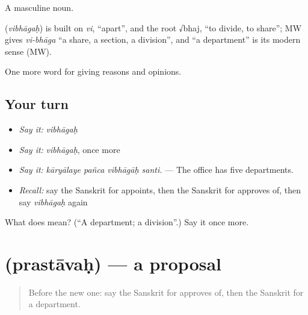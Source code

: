 A masculine noun.

\begin{cousinweb}
\textbf{} (\emph{vibhāgaḥ}) is built on \emph{vi}, \textquotedblleft{}apart\textquotedblright{}, and the root √bhaj, \textquotedblleft{}to divide, to share\textquotedblright{}; MW gives \emph{vi-bhāga} \textquotedblleft{}a share, a section, a division\textquotedblright{}, and \textquotedblleft{}a department\textquotedblright{} is its modern sense (MW).
\end{cousinweb}

\begin{grammarlens}[title={What you've built}]
One more word for giving reasons and opinions.
\end{grammarlens}

\subsection*{Your turn}
\begin{itemize}
\raggedright
  \item \emph{Say it:} \emph{vibhāgaḥ}
  \item \emph{Say it:} \emph{vibhāgaḥ}, once more
  \item \emph{Say it:} \emph{kāryālaye pañca vibhāgāḥ santi.} — The office has five departments.
  \item \emph{Recall:} say the Sanskrit for appoints, then the Sanskrit for approves of, then say \emph{vibhāgaḥ} again
\end{itemize}

\begin{tcolorbox}[breakable,colback=teal!4,colframe=teal!35!black,title={Before you move on}]
What does  mean? (\textquotedblleft{}A department; a division\textquotedblright{}.) Say it once more.
\end{tcolorbox}
\section[\texorpdfstring{\sk{प्रस्तावः} (prastāvaḥ)}{प्रस्तावः (prastāvaḥ)}]{ (prastāvaḥ) — a proposal}

\label{lesson:SA-C356-prastavah}



\begin{quote}
Before the new one: say the Sanskrit for approves of, then the Sanskrit for a department.
\end{quote}

